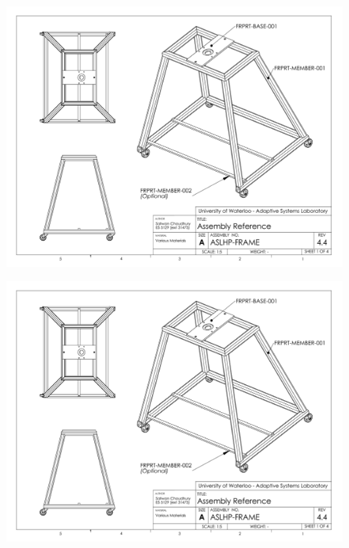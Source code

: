 \begin{figure}[!h]
	\begin{center}
    \includegraphics[scale=0.72,angle=90]{fig/drawings/aslhp-frame.pdf}
	\end{center}
\end{figure}

\begin{figure}[!h]
	\begin{center}
    \includegraphics[scale=0.72,angle=90,page=2]{fig/drawings/aslhp-frame.pdf}
	\end{center}
\end{figure}